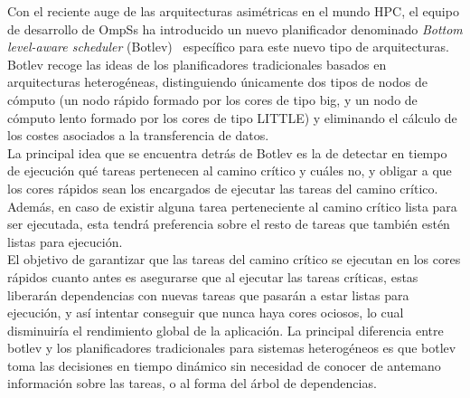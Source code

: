 Con el reciente auge de las arquitecturas asimétricas en el mundo HPC, el
equipo de desarrollo de OmpSs ha introducido un nuevo planificador
denominado \emph{Bottom level-aware scheduler} (Botlev)~\cite{botlev}
específico para este nuevo tipo de arquitecturas. Botlev recoge las ideas
de los planificadores tradicionales basados en arquitecturas heterogéneas,
distinguiendo únicamente dos tipos de nodos de cómputo (un nodo rápido
formado por los cores de tipo big, y un nodo de cómputo lento formado por
los cores de tipo LITTLE) y eliminando el
cálculo de los costes asociados a la transferencia de datos. \\
La principal idea que se encuentra detrás de Botlev es la de detectar en
tiempo de ejecución qué tareas pertenecen al camino crítico y cuáles no, y
obligar a que los cores rápidos sean los encargados de ejecutar las tareas
del camino crítico. Además, en caso de existir alguna tarea perteneciente
al camino crítico lista para ser ejecutada, esta tendrá preferencia sobre
el resto de tareas que también estén listas para ejecución.\\
El objetivo de garantizar que las tareas del camino crítico se ejecutan en
los cores rápidos cuanto antes es asegurarse que al ejecutar las tareas
críticas, estas liberarán dependencias con nuevas tareas que pasarán a
estar listas para ejecución, y así intentar conseguir que nunca haya cores
ociosos, lo cual disminuiría el rendimiento global de la aplicación. La
principal diferencia entre botlev y los planificadores tradicionales para
sistemas heterogéneos es que botlev toma las decisiones en tiempo dinámico
sin necesidad de conocer de antemano información sobre las tareas, o al
forma del árbol de dependencias.

